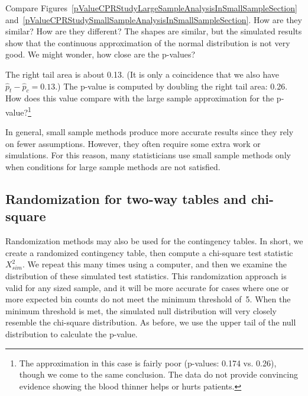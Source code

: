\begin{example}{Compare Figures~\ref{pValueCPRStudyLargeSampleAnalysisInSmallSampleSection} and~\ref{pValueCPRStudySmallSampleAnalysisInSmallSampleSection}. How are they similar? How are they different?}
The shapes are similar, but the simulated results show that the continuous approximation of the normal distribution is not very good. We might wonder, how close are the p-values?
\end{example}

\begin{exercise} \label{comparisonOfLargeSampleAndSmallSamplePValueInCPRStudy}
The right tail area is about 0.13. (It is only a coincidence that we also have $\hat{p}_t - \hat{p}_c=0.13$.) The p-value is computed by doubling the right tail area: 0.26. How does this value compare with the large sample approximation for the p-value?\footnote{The approximation in this case is fairly poor (p-values: 0.174 vs. 0.26), though we come to the same conclusion. The data do not provide convincing evidence showing the blood thinner helps or hurts patients.}
\end{exercise}

In general, small sample methods produce more accurate results since they rely on fewer assumptions. However, they often require some extra work or simulations. For this reason, many statisticians use small sample methods only when conditions for large sample methods are not satisfied.


\subsection{Randomization for two-way tables and chi-square}

Randomization methods may also be used for the contingency tables. In short, we create a randomized contingency table, then compute a chi-square test statistic $X_{sim}^2$. We repeat this many times using a computer, and then we examine the distribution of these simulated test statistics. This randomization approach is valid for any sized sample, and it will be more accurate for cases where one or more expected bin counts do not meet the minimum threshold of~5. When the minimum threshold is met, the simulated null distribution will very closely resemble the chi-square distribution. As before, we use the upper tail of the null distribution to calculate the p-value.



